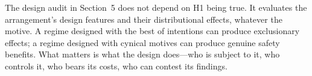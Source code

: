 The design audit in Section~5 does not depend on H1 being true. It evaluates the arrangement's design features and their distributional effects, whatever the motive. A regime designed with the best of intentions can produce exclusionary effects; a regime designed with cynical motives can produce genuine safety benefits. What matters is what the design does---who is subject to it, who controls it, who bears its costs, who can contest its findings.
